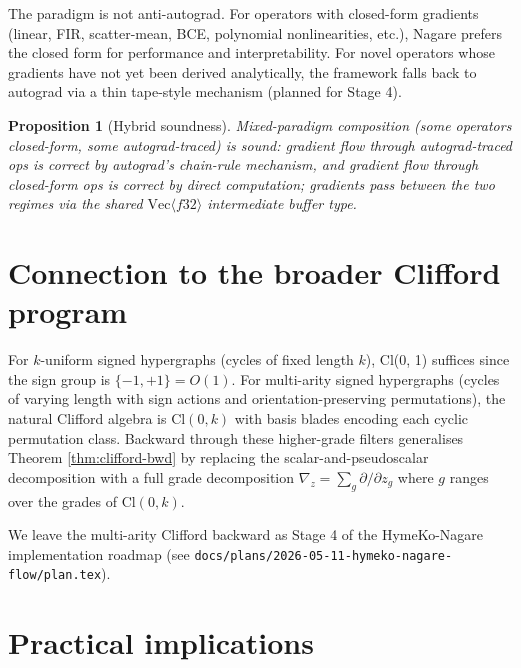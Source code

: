 \documentclass[11pt]{article}
\newtheorem{prop}[theorem]{Proposition}
\begin{document}
The paradigm is not anti-autograd. For operators with closed-form
gradients (linear, FIR, scatter-mean, BCE, polynomial nonlinearities,
etc.), Nagare prefers the closed form for performance and
interpretability. For novel operators whose gradients have not yet
been derived analytically, the framework falls back to autograd
via a thin tape-style mechanism (planned for Stage 4).

\begin{prop}[Hybrid soundness]
Mixed-paradigm composition (some operators closed-form, some
autograd-traced) is sound: gradient flow through autograd-traced
ops is correct by autograd's chain-rule mechanism, and gradient
flow through closed-form ops is correct by direct computation;
gradients pass between the two regimes via the shared
$\mathrm{Vec}\langle f32 \rangle$ intermediate buffer type.
\end{prop}

\section{Connection to the broader Clifford program}

For $k$-uniform signed hypergraphs (cycles of fixed length $k$),
Cl(0, 1) suffices since the sign group is $\{-1, +1\} = O(1)$. For
multi-arity signed hypergraphs (cycles of varying length with
sign actions and orientation-preserving permutations), the natural
Clifford algebra is $\mathrm{Cl}(0, k)$ with basis blades encoding
each cyclic permutation class. Backward through these higher-grade
filters generalises Theorem \ref{thm:clifford-bwd} by replacing
the scalar-and-pseudoscalar decomposition with a full grade
decomposition $\nabla_z = \sum_g \partial / \partial z_g$ where $g$
ranges over the grades of $\mathrm{Cl}(0, k)$.

We leave the multi-arity Clifford backward as Stage 4 of the
HymeKo-Nagare implementation roadmap (see
\texttt{docs/plans/2026-05-11-hymeko-nagare-flow/plan.tex}).

\section{Practical implications}
\end{document}
